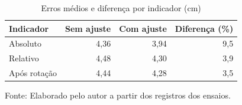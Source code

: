 \begin{table}[H]\centering
\caption{Erros médios e diferença por indicador (cm)}\label{tab:reanalise-global}
\small\begin{tabular}{lrrr}\toprule
Indicador & Sem ajuste & Com ajuste & Diferença (\%)\\\midrule
Absoluto & 4,36 & 3,94 & 9,5\\
Relativo & 4,48 & 4,30 & 3,9\\
Após rotação & 4,44 & 4,28 & 3,5\\
\bottomrule\end{tabular}\par\smallskip
{\footnotesize Fonte: Elaborado pelo autor a partir dos registros dos ensaios.}\end{table}
